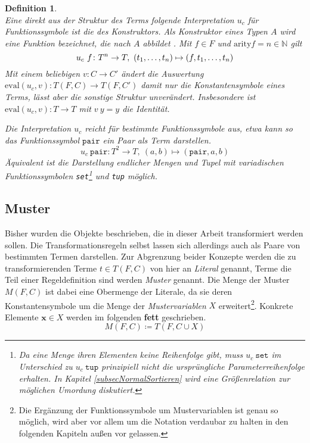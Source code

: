 \newtheorem{defKonstruktor}[bsp]{Definition}
\begin{defKonstruktor}~\\
Eine direkt aus der Struktur des Terms folgende Interpretation $u_c$ für Funktionssymbole ist die des \emph{Konstruktors}. Als Konstruktor eines Typen $A$ wird eine Funktion bezeichnet, die nach $A$ abbildet \cite{haskellConstructor}. Mit $f \in F$ und $\mathrm{arity} f = n \in \mathbb N$ 
gilt $$u_c~f \colon T^n \rightarrow T, ~({t}_{1}, \dots, {t}_{n}) \mapsto (f, {t}_{1}, \dots, {t}_{n})$$
Mit einem beliebigen $v \colon C \rightarrow C'$ ändert die Auswertung $\mathrm{eval}(u_c, v) \colon T(F, C) \rightarrow T(F, C')$ damit nur die Konstantensymbole eines Terms, lässt aber die sonstige Struktur unverändert. Insbesondere ist $\mathrm{eval}(u_c, v) \colon T \rightarrow T$ mit $v~y = y$ die Identität.

Die Interpretation $u_c$ reicht für bestimmte Funktionssymbole aus, etwa kann so das Funktionssymbol $\texttt{pair}$ ein Paar als Term darstellen.
$$u_c~\texttt{pair} \colon T^2 \rightarrow T, ~(a, b) \mapsto (\texttt{pair}, a, b)$$
Äquivalent ist die Darstellung endlicher Mengen und Tupel mit variadischen Funktionssymbolen \texttt{set}\footnote{Da eine Menge ihren Elementen keine Reihenfolge gibt, muss $u_c~\texttt{set}$ im Unterschied zu $u_c~\texttt{tup}$ prinzipiell nicht die ursprüngliche Parameterreihenfolge erhalten. In Kapitel \ref{subsecNormalSortieren} wird eine Größenrelation zur möglichen Umordung diskutiert.} und \texttt{tup} möglich.
\end{defKonstruktor}


\subsection{Muster} \label{subsecMuster}

Bisher wurden die Objekte beschrieben, die in dieser Arbeit transformiert werden sollen. Die Transformationsregeln selbst lassen sich allerdings auch als Paare von bestimmten Termen darstellen. Zur Abgrenzung beider Konzepte werden die zu transformierenden Terme $t\in T(F, C)$ von hier an \emph{Literal} genannt, Terme die  Teil einer Regeldefinition sind werden \emph{Muster} genannt. Die Menge der Muster $M(F, C)$ ist dabei eine Obermenge der Literale, da sie deren Konstantensymbole um die Menge der \emph{Mustervariablen} $X$ erweitert\footnote{Die Ergänzung der Funktionssymbole um Mustervariablen ist genau so möglich, wird aber vor allem um die Notation verdaubar zu halten in den folgenden Kapiteln außen vor gelassen.}. Konkrete Elemente $\mathbf x \in X$ werden im folgenden \textbf{fett} geschrieben.
$$M(F, C) \coloneqq T(F, C \cup X)$$

